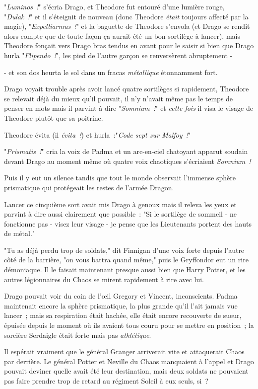 "\emph{Luminos~!}" s'écria Drago, et Theodore fut entouré d'une lumière rouge, "\emph{Dulak~!}" et il s'éteignit de nouveau (donc Theodore \emph{était} toujours affecté par la magie), "\emph{Expelliarmus~!}" et la baguette de Theodore s'envola (et Drago se rendit alors compte que de toute façon ça aurait été un bon sortilège à lancer), mais Theodore fonçait vers Drago bras tendus en avant pour le saisir si bien que Drago hurla "\emph{Flipendo~!}", les pied de l'autre garçon se renversèrent abruptement -

- et son dos heurta le sol dans un fracas \emph{métallique} étonnamment fort.

Drago voyait trouble après avoir lancé quatre sortilèges si rapidement, Theodore se relevait déjà du mieux qu'il pouvait, il n'y n'avait même pas le temps de penser en mots mais il parvint à dire "\emph{Somnium~!}" et \emph{cette fois} il visa le visage de Theodore plutôt que sa poitrine.

Theodore évita (il \emph{évita~!}) et hurla~:"\emph{Code sept sur Malfoy~!}"

"\emph{Prismatis~!}" cria la voix de Padma et un arc-en-ciel chatoyant apparut soudain devant Drago au moment même où quatre voix chaotiques s'écriaient \emph{Somnium~!}

Puis il y eut un silence tandis que tout le monde observait l'immense sphère prismatique qui protégeait les restes de l'armée Dragon.

Lancer ce cinquième sort avait mis Drago à genoux mais il releva les yeux et parvint à dire aussi clairement que possible~: "Si le sortilège de sommeil - ne fonctionne pas - visez leur visage - je pense que les Lieutenants portent des hauts de métal."

"Tu as déjà perdu trop de soldats," dit Finnigan d'une voix forte depuis l'autre côté de la barrière, "on vous battra quand même," puis le Gryffondor eut un rire démoniaque. Il le faisait maintenant presque aussi bien que Harry Potter, et les autres légionnaires du Chaos se mirent rapidement à rire avec lui.

Drago pouvait voir du coin de l'œil Gregory et Vincent, inconscients. Padma maintenait encore la sphère prismatique, la plus grande qu'il l'ait jamais vue lancer~; mais sa respiration était hachée, elle était encore recouverte de sueur, épuisée depuis le moment où ils avaient tous couru pour se mettre en position~; la sorcière Serdaigle était forte mais pas \emph{athlétique}.

Il espérait vraiment que le général Granger arriverait vite et attaquerait Chaos par derrière. Le général Potter et Neville du Chaos manquaient à l'appel et Drago pouvait deviner quelle avait été leur destination, mais deux soldats ne pouvaient pas faire prendre trop de retard au régiment Soleil à eux seuls, si~?


